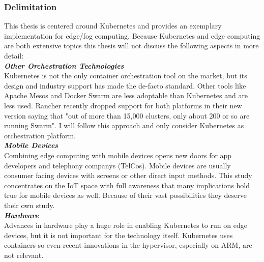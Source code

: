\subsubsection{Delimitation} \label{sec:delimitation}
This thesis is centered around Kubernetes and provides an exemplary implementation for edge/fog computing. Because Kubernetes and edge computing are both extensive topics this thesis will not discuss the following aspects in more detail:\\[5mm]
\textbf{\textit{Other Orchestration Technologies}}\\
Kubernetes is not the only container orchestration tool on the market, but its design and industry support has made the de-facto standard. Other tools like Apache Mesos\cite{ApacheMesos19:online} and Docker Swarm\cite{DockerSwarmmod12:online} are less adoptable than Kubernetes and are less used. Rancher recently dropped support for both platforms in their new version saying that "out of more than 15,000 clusters, only about 200 or so are running Swarm"\cite{FAQ36RancherSwarmMesos:online}. I will follow this approach and only consider Kubernetes as orchestration platform.\\[5mm]
\textbf{\textit{Mobile Devices}}\\
Combining edge computing with mobile devices opens new doors for app developers and telephony companys (TelCos). Mobile devices are usually consumer facing devices with screens or other direct input methods. This study concentrates on the IoT space with full awareness that many implications hold true for mobile devices as well. Because of their vast possibilities they deserve their own study.\\[5mm]
\textbf{\textit{Hardware}}\\
Advances in hardware play a huge role in enabling Kubernetes to run on edge devices, but it is not important for the technology itself. Kubernetes uses containers so even recent innovations in the hypervisor, especially on ARM, are not relevant.\\[5mm]
